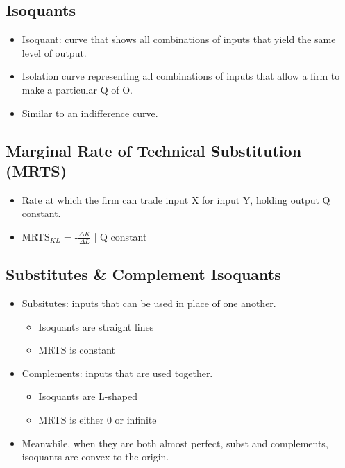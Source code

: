 \documentclass{article}
\begin{document}
\subsection{Isoquants}
\begin{itemize}
  \item Isoquant: curve that shows all combinations of inputs
    that yield the same level of output.
  \item Isolation curve representing all combinations of inputs that allow
    a firm to make a particular Q of O.
  \item Similar to an indifference curve.
\end{itemize}

\subsection{Marginal Rate of Technical Substitution (MRTS)}
\begin{itemize}
  \item Rate at which the firm can trade input X for input Y, holding
    output Q constant.
  \item MRTS$_{KL}$ = -$\frac{\Delta K}{\Delta L}$ | Q constant
\end{itemize}

\subsection{Substitutes \& Complement Isoquants}
\begin{itemize}
  \item Subsitutes: inputs that can be used in place of one another.
    \begin{itemize}
      \item Isoquants are straight lines
      \item MRTS is constant
    \end{itemize}
  \item Complements: inputs that are used together.
    \begin{itemize}
      \item Isoquants are L-shaped
      \item MRTS is either 0 or infinite
    \end{itemize}
  \item Meanwhile, when they are both almost perfect, subst and complements,
    isoquants are convex to the origin.
\end{itemize}
\end{document}
